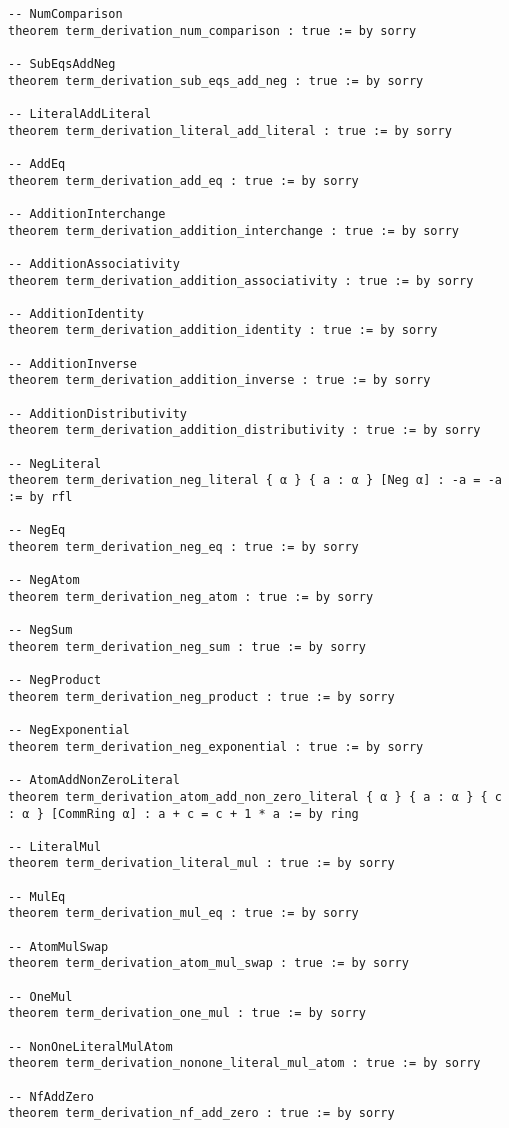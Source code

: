 \documentclass{article}
\begin{document}
\begin{tcolorbox}[colback=white!10, width=\linewidth]
\begin{lstlisting}[language=Lean4]
-- NumComparison
theorem term_derivation_num_comparison : true := by sorry

-- SubEqsAddNeg
theorem term_derivation_sub_eqs_add_neg : true := by sorry

-- LiteralAddLiteral
theorem term_derivation_literal_add_literal : true := by sorry

-- AddEq
theorem term_derivation_add_eq : true := by sorry

-- AdditionInterchange
theorem term_derivation_addition_interchange : true := by sorry

-- AdditionAssociativity
theorem term_derivation_addition_associativity : true := by sorry

-- AdditionIdentity
theorem term_derivation_addition_identity : true := by sorry

-- AdditionInverse
theorem term_derivation_addition_inverse : true := by sorry

-- AdditionDistributivity
theorem term_derivation_addition_distributivity : true := by sorry

-- NegLiteral
theorem term_derivation_neg_literal { α } { a : α } [Neg α] : -a = -a := by rfl

-- NegEq
theorem term_derivation_neg_eq : true := by sorry

-- NegAtom
theorem term_derivation_neg_atom : true := by sorry

-- NegSum
theorem term_derivation_neg_sum : true := by sorry

-- NegProduct
theorem term_derivation_neg_product : true := by sorry

-- NegExponential
theorem term_derivation_neg_exponential : true := by sorry

-- AtomAddNonZeroLiteral
theorem term_derivation_atom_add_non_zero_literal { α } { a : α } { c : α } [CommRing α] : a + c = c + 1 * a := by ring

-- LiteralMul
theorem term_derivation_literal_mul : true := by sorry

-- MulEq
theorem term_derivation_mul_eq : true := by sorry

-- AtomMulSwap
theorem term_derivation_atom_mul_swap : true := by sorry

-- OneMul
theorem term_derivation_one_mul : true := by sorry

-- NonOneLiteralMulAtom
theorem term_derivation_nonone_literal_mul_atom : true := by sorry

-- NfAddZero
theorem term_derivation_nf_add_zero : true := by sorry


\end{lstlisting}
\end{tcolorbox}
\end{document}
